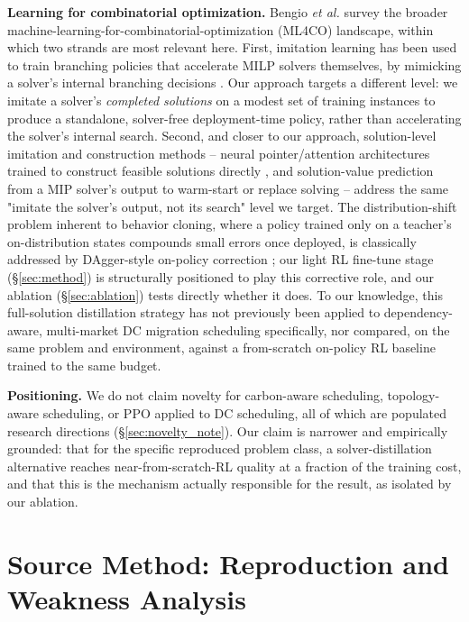 \documentclass[journal]{IEEEtran}
\begin{document}
\textbf{Learning for combinatorial optimization.} Bengio \textit{et al.} \cite{bengio2021} survey the broader machine-learning-for-combinatorial-optimization (ML4CO) landscape, within which two strands are most relevant here. First, imitation learning has been used to train branching policies that accelerate MILP solvers themselves, by mimicking a solver's internal branching decisions \cite{benmhamed2026,relwork_branch2}. Our approach targets a different level: we imitate a solver's \textit{completed solutions} on a modest set of training instances to produce a standalone, solver-free deployment-time policy, rather than accelerating the solver's internal search. Second, and closer to our approach, solution-level imitation and construction methods -- neural pointer/attention architectures trained to construct feasible solutions directly \cite{vinyals2015,kool2019}, and solution-value prediction from a MIP solver's output to warm-start or replace solving \cite{ding2020} -- address the same "imitate the solver's output, not its search" level we target. The distribution-shift problem inherent to behavior cloning, where a policy trained only on a teacher's on-distribution states compounds small errors once deployed, is classically addressed by DAgger-style on-policy correction \cite{ross2011}; our light RL fine-tune stage (\S\ref{sec:method}) is structurally positioned to play this corrective role, and our ablation (\S\ref{sec:ablation}) tests directly whether it does. To our knowledge, this full-solution distillation strategy has not previously been applied to dependency-aware, multi-market DC migration scheduling specifically, nor compared, on the same problem and environment, against a from-scratch on-policy RL baseline trained to the same budget.

\textbf{Positioning.} We do not claim novelty for carbon-aware scheduling, topology-aware scheduling, or PPO applied to DC scheduling, all of which are populated research directions (\S\ref{sec:novelty_note}). Our claim is narrower and empirically grounded: that for the specific reproduced problem class, a solver-distillation alternative reaches near-from-scratch-RL quality at a fraction of the training cost, and that this is the mechanism actually responsible for the result, as isolated by our ablation.

\section{Source Method: Reproduction and Weakness Analysis}
\label{sec:reproduction}
\end{document}
